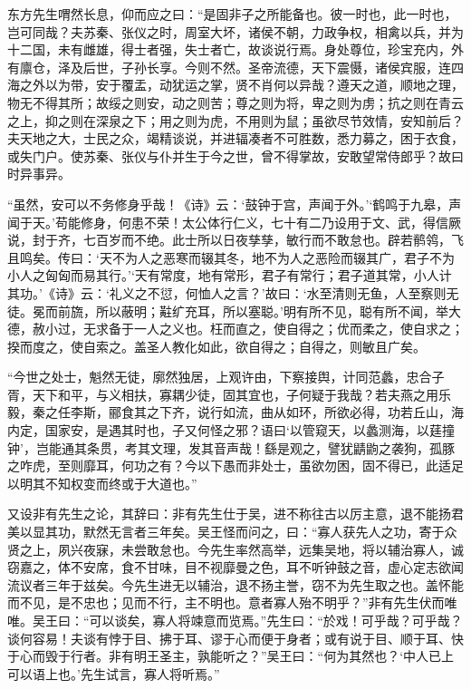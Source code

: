 \documentclass[12pt,UTF8]{ctexbook}
\begin{document}
东方先生喟然长息，仰而应之曰：“是固非子之所能备也。彼一时也，此一时也，岂可同哉？夫苏秦、张仪之时，周室大坏，诸侯不朝，力政争权，相禽以兵，并为十二国，未有雌雄，得士者强，失士者亡，故谈说行焉。身处尊位，珍宝充内，外有廪仓，泽及后世，子孙长享。今则不然。圣帝流德，天下震慑，诸侯宾服，连四海之外以为带，安于覆盂，动犹运之掌，贤不肖何以异哉？遵天之道，顺地之理，物无不得其所；故绥之则安，动之则苦；尊之则为将，卑之则为虏；抗之则在青云之上，抑之则在深泉之下；用之则为虎，不用则为鼠；虽欲尽节效情，安知前后？夫天地之大，士民之众，竭精谈说，并进辐凑者不可胜数，悉力募之，困于衣食，或失门户。使苏秦、张仪与仆并生于今之世，曾不得掌故，安敢望常侍郎乎？故曰时异事异。



“虽然，安可以不务修身乎哉！《诗》云：‘鼓钟于宫，声闻于外。’‘鹤鸣于九皋，声闻于天。’苟能修身，何患不荣！太公体行仁义，七十有二乃设用于文、武，得信厥说，封于齐，七百岁而不绝。此士所以日夜孳孳，敏行而不敢怠也。辟若鹡鸰，飞且鸣矣。传曰：‘天不为人之恶寒而辍其冬，地不为人之恶险而辍其广，君子不为小人之匈匈而易其行。’‘天有常度，地有常形，君子有常行；君子道其常，小人计其功。’《诗》云：‘礼义之不愆，何恤人之言？’故曰：‘水至清则无鱼，人至察则无徒。冕而前旒，所以蔽明；黈纩充耳，所以塞聪。’明有所不见，聪有所不闻，举大德，赦小过，无求备于一人之义也。枉而直之，使自得之；优而柔之，使自求之；揆而度之，使自索之。盖圣人教化如此，欲自得之；自得之，则敏且广矣。



“今世之处士，魁然无徒，廓然独居，上观许由，下察接舆，计同范蠡，忠合子胥，天下和平，与义相扶，寡耦少徒，固其宜也，子何疑于我哉？若夫燕之用乐毅，秦之任李斯，郦食其之下齐，说行如流，曲从如环，所欲必得，功若丘山，海内定，国家安，是遇其时也，子又何怪之邪？语曰‘以管窥天，以蠡测海，以莛撞钟’，岂能通其条贯，考其文理，发其音声哉！繇是观之，譬犹鼱鼩之袭狗，孤豚之咋虎，至则靡耳，何功之有？今以下愚而非处士，虽欲勿困，固不得已，此适足以明其不知权变而终或于大道也。”



又设非有先生之论，其辞曰：非有先生仕于吴，进不称往古以厉主意，退不能扬君美以显其功，默然无言者三年矣。吴王怪而问之，曰：“寡人获先人之功，寄于众贤之上，夙兴夜寐，未尝敢怠也。今先生率然高举，远集吴地，将以辅治寡人，诚窃嘉之，体不安席，食不甘味，目不视靡曼之色，耳不听钟鼓之音，虚心定志欲闻流议者三年于兹矣。今先生进无以辅治，退不扬主誉，窃不为先生取之也。盖怀能而不见，是不忠也；见而不行，主不明也。意者寡人殆不明乎？”非有先生伏而唯唯。吴王曰：“可以谈矣，寡人将竦意而览焉。”先生曰：“於戏！可乎哉？可乎哉？谈何容易！夫谈有悖于目、拂于耳、谬于心而便于身者；或有说于目、顺于耳、快于心而毁于行者。非有明王圣主，孰能听之？”吴王曰：“何为其然也？‘中人已上可以语上也。’先生试言，寡人将听焉。”
\end{document}
